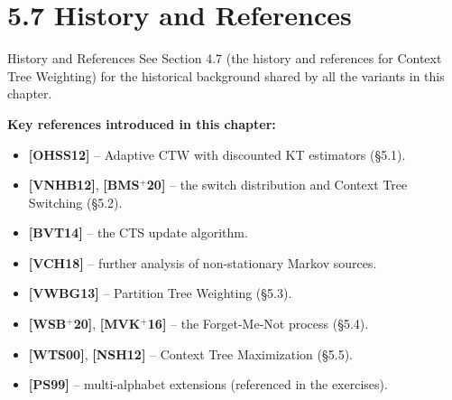 \documentclass[aspectratio=169,10pt]{beamer}
\begin{document}
\section{5.7 History and References}

\begin{frame}{History and References}
  See Section 4.7 (the history and references for Context Tree Weighting)
  for the historical background shared by all the variants in this chapter.

  \bigskip
  \textbf{Key references introduced in this chapter:}
  \begin{itemize}
    \item \textbf{[OHSS12]} -- Adaptive CTW with discounted KT estimators
      (\S5.1).
    \item \textbf{[VNHB12]}, \textbf{[BMS$^+$20]} -- the switch distribution
      and Context Tree Switching (\S5.2).
    \item \textbf{[BVT14]} -- the CTS update algorithm.
    \item \textbf{[VCH18]} -- further analysis of non-stationary Markov
      sources.
    \item \textbf{[VWBG13]} -- Partition Tree Weighting (\S5.3).
    \item \textbf{[WSB$^+$20]}, \textbf{[MVK$^+$16]} -- the Forget-Me-Not
      process (\S5.4).
    \item \textbf{[WTS00]}, \textbf{[NSH12]} -- Context Tree Maximization
      (\S5.5).
    \item \textbf{[PS99]} -- multi-alphabet extensions (referenced in the
      exercises).
  \end{itemize}
\end{frame}

\end{document}
